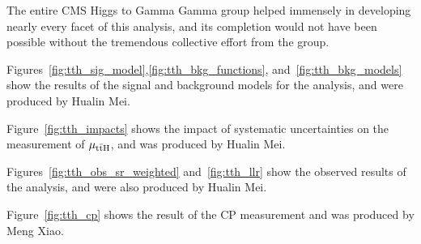 The entire CMS Higgs to Gamma Gamma group helped immensely in developing nearly every facet of this analysis, and its completion would not have been possible without the tremendous collective effort from the group.

Figures~\ref{fig:tth_sig_model},\ref{fig:tth_bkg_functions}, and~\ref{fig:tth_bkg_models} show the results of the signal and background models for the \ttH analysis, and were produced by Hualin Mei.

Figure~\ref{fig:tth_impacts} shows the impact of systematic uncertainties on the measurement of $\mu_{\mathrm{t\bar{t}H}}$, and was produced by Hualin Mei.

Figures~\ref{fig:tth_obs_sr_weighted} and~\ref{fig:tth_llr} show the observed results of the \ttH analysis, and were also produced by
Hualin Mei.

Figure~\ref{fig:tth_cp} shows the result of the \ttH CP measurement and was produced by Meng Xiao.
